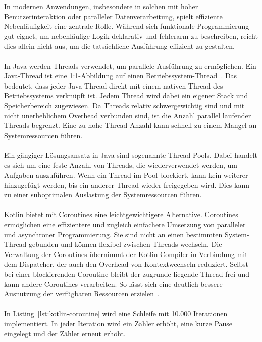 \documentclass[11pt]{article}
\begin{document}
    In modernen Anwendungen, insbesondere in solchen mit hoher Benutzerinteraktion oder paralleler Datenverarbeitung, spielt effiziente Nebenläufigkeit eine zentrale Rolle.
    Während sich funktionale Programmierung gut eignet, um nebenläufige Logik deklarativ und fehlerarm zu beschreiben, reicht dies allein nicht aus, um die tatsächliche Ausführung effizient zu gestalten.\\
    \\
    In Java werden Threads verwendet, um parallele Ausführung zu ermöglichen.
    Ein Java-Thread ist eine 1:1-Abbildung auf einen Betriebssystem-Thread~\cite[940]{insel}.
    Das bedeutet, dass jeder Java-Thread direkt mit einem nativen Thread des Betriebssystems verknüpft ist.
    Jedem Thread wird dabei ein eigener Stack und Speicherbereich zugewiesen.
    Da Threads relativ schwergewichtig sind und mit nicht unerheblichem Overhead verbunden sind, ist die Anzahl parallel laufender Threads begrenzt.
    Eine zu hohe Thread-Anzahl kann schnell zu einem Mangel an Systemressourcen führen.\\
    \\
    Ein gängiger Lösungsansatz in Java sind sogenannte Thread-Pools.
    Dabei handelt es sich um eine feste Anzahl von Threads, die wiederverwendet werden, um Aufgaben auszuführen.
    Wenn ein Thread im Pool blockiert, kann kein weiterer hinzugefügt werden, bis ein anderer Thread wieder freigegeben wird.
    Dies kann zu einer suboptimalen Auslastung der Systemressourcen führen.\\
    \\
    Kotlin bietet mit Coroutines eine leichtgewichtigere Alternative.
    Coroutines ermöglichen eine effizientere und zugleich einfachere Umsetzung von paralleler und asynchroner Programmierung.
    Sie sind nicht an einen bestimmten System-Thread gebunden und können flexibel zwischen Threads wechseln.
    Die Verwaltung der Coroutines übernimmt der Kotlin-Compiler in Verbindung mit dem Dispatcher, der auch den Overhead von Kontextwechseln reduziert.
    Selbst bei einer blockierenden Coroutine bleibt der zugrunde liegende Thread frei und kann andere Coroutines verarbeiten.
    So lässt sich eine deutlich bessere Ausnutzung der verfügbaren Ressourcen erzielen~\cite[194]{kotlin-patterns}.\\
    \\
    In Listing~\ref{lst:kotlin-coroutine} wird eine Schleife mit 10.000 Iterationen implementiert.
    In jeder Iteration wird ein Zähler erhöht, eine kurze Pause eingelegt und der Zähler erneut erhöht.
\end{document}
